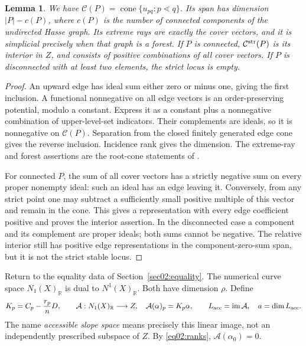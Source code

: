\documentclass[11pt]{amsart}
\newtheorem{lemma}[theorem]{Lemma}
\theoremstyle{definition}
\theoremstyle{remark}
\newcommand{\RR}{\mathbb R}
\newcommand{\cC}{\mathcal C}
\newcommand{\im}{\operatorname{im}}
\newcommand{\cone}{\operatorname{cone}}
\begin{document}
\begin{lemma}\label{lem03:root}
We have \(\cC(P)=\cone\{u_{pq}:p\lessdot q\}\). Its span has
dimension \(|P|-c(P)\), where \(c(P)\) is the number of connected
components of the undirected Hasse graph. Its extreme rays are exactly
the cover vectors, and it is simplicial precisely when that graph is
a forest. If \(P\) is connected, \(\cC^{\rm str}(P)\) is its
interior in \(Z\), and consists of positive combinations of all
cover vectors. If \(P\) is disconnected with at least two elements,
the strict locus is empty.
\end{lemma}

\begin{proof}
An upward edge has ideal sum either zero or minus one, giving the
first inclusion. A functional nonnegative on all edge vectors is an
order-preserving potential, modulo a constant. Express it as a
constant plus a nonnegative combination of upper-level-set
indicators. Their complements are ideals, so it is nonnegative on
\(\cC(P)\). Separation from the closed finitely generated edge cone
gives the reverse inclusion. Incidence rank gives the dimension.
The extreme-ray and forest assertions are the root-cone statements
of \cite[Proposition~5.1(i) and Corollary~5.3]{boussicaultferaylascouxreiner2012}.

For connected \(P\), the sum of all cover vectors has a strictly
negative sum on every proper nonempty ideal: such an ideal has an
edge leaving it. Conversely, from any strict point one may subtract
a sufficiently small positive multiple of this vector and remain in
the cone. This gives a representation with every edge coefficient
positive and proves the interior assertion. In the disconnected case
a component and its complement are proper ideals; both sums cannot
be negative. The relative interior still has positive edge
representations in the component-zero-sum span, but it is not the
strict stable locus.
\end{proof}

Return to the equality data of Section~\ref{sec02:equality}. The
numerical curve space \(N_1(X)_\RR\) is dual to \(N^1(X)_\RR\).
Both have dimension \(\rho\). Define
\begin{equation}\label{eq03:accessible}
 K_p=C_p-\frac{r_p}{n}D,\qquad
 \mathcal A:N_1(X)_\RR\longrightarrow Z,\quad
 \mathcal A(\alpha)_p=K_p\alpha,
 \qquad L_{\rm acc}=\im\mathcal A,\quad a=\dim L_{\rm acc}.
\end{equation}
The name \emph{accessible slope space} means precisely this linear
image, not an independently prescribed subspace of \(Z\).
By \eqref{eq02:ranks}, \(\mathcal A(\alpha_0)=0\).
\end{document}
